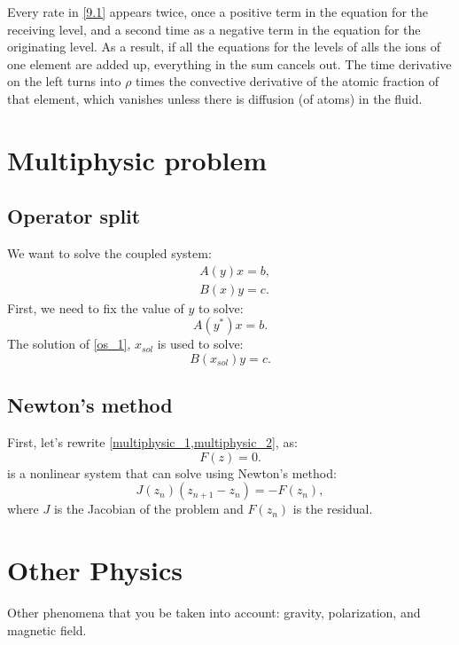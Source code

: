 Every rate in \cref{9.1} appears twice, once a positive term in the equation
for the receiving level, and a second time as a negative term in the equation
for the originating level. As a result, if all the equations for the levels
of alls the ions of one element are added up, everything in the sum cancels
out. The time derivative on the left turns into $\rho$ times the convective
derivative of the atomic fraction of that element, which vanishes unless there
is diffusion (of atoms) in the fluid.

\section{Multiphysic problem}
\subsection{Operator split}
We want to solve the coupled system:
\begin{align}
  &A(y) x = b, \label{multiphysic_1}\\
  &B(x) y = c. \label{multiphysic_2}
\end{align}
First, we need to fix the value of $y$ to solve:
\begin{equation}
  A(y^*) x = b.
  \label{os_1}
\end{equation}
The solution of \cref{os_1}, $x_{sol}$ is used to solve:
\begin{equation}
  B(x_{sol}) y = c.
\end{equation}
\subsection{Newton's method}
First, let's rewrite \cref{multiphysic_1,multiphysic_2}, as:
\begin{equation}
  F(z) = 0.
  \label{multiphysic_3}
\end{equation}
 is a nonlinear system that can solve using Newton's
method:
\begin{equation}
  J(z_n) (z_{n+1}-z_n) = -F(z_n),
\end{equation}
where $J$ is the Jacobian of the problem and $F(z_n)$ is the residual.

\section{Other Physics}
Other phenomena that you be taken into account: gravity, polarization, and
magnetic field.

